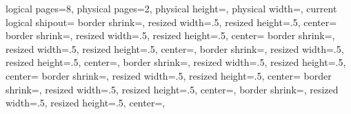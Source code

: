 
\usepackage{pgfmorepages}

{%
  \edef\pgfpageoptionheight{\the\paperheight}
  \edef\pgfpageoptionwidth{\the\paperwidth}
  \def\pgfpageoptionborder{0pt}
  \def\pgfpageoptionfirstshipout{1}
}%
{%
  \pgfpagesphysicalpageoptions
  {%
    logical pages=8,%
    physical pages=2,%
    physical height=\pgfpageoptionheight,%
    physical width=\pgfpageoptionwidth,%
    current logical shipout=\pgfpageoptionfirstshipout%
  }
    {%
      border shrink=\pgfpageoptionborder,%
      resized width=.5\pgfphysicalwidth,%
      resized height=.5\pgfphysicalheight,%
      center=\pgfpoint{.25\pgfphysicalwidth}{.75\pgfphysicalheight}%
    }%
    {%
      border shrink=\pgfpageoptionborder,%
      resized width=.5\pgfphysicalwidth,%
      resized height=.5\pgfphysicalheight,%
      center=\pgfpoint{.75\pgfphysicalwidth}{.75\pgfphysicalheight}%
    }%
    {%
      border shrink=\pgfpageoptionborder,%
      resized width=.5\pgfphysicalwidth,%
      resized height=.5\pgfphysicalheight,%
      center=\pgfpoint{.25\pgfphysicalwidth}{.25\pgfphysicalheight},%
    }%
    {%
      border shrink=\pgfpageoptionborder,%
      resized width=.5\pgfphysicalwidth,%
      resized height=.5\pgfphysicalheight,%
      center=\pgfpoint{.75\pgfphysicalwidth}{.25\pgfphysicalheight},%
    }%
    {%
      border shrink=\pgfpageoptionborder,%
      resized width=.5\pgfphysicalwidth,%
      resized height=.5\pgfphysicalheight,%
      center=\pgfpoint{.25\pgfphysicalwidth}{.75\pgfphysicalheight}%
    }%
    {%
      border shrink=\pgfpageoptionborder,%
      resized width=.5\pgfphysicalwidth,%
      resized height=.5\pgfphysicalheight,%
      center=\pgfpoint{.75\pgfphysicalwidth}{.75\pgfphysicalheight}%
    }%
    {%
      border shrink=\pgfpageoptionborder,%
      resized width=.5\pgfphysicalwidth,%
      resized height=.5\pgfphysicalheight,%
      center=\pgfpoint{.25\pgfphysicalwidth}{.25\pgfphysicalheight},%
    }%
    {%
      border shrink=\pgfpageoptionborder,%
      resized width=.5\pgfphysicalwidth,%
      resized height=.5\pgfphysicalheight,%
      center=\pgfpoint{.75\pgfphysicalwidth}{.25\pgfphysicalheight},%
    }%
}



